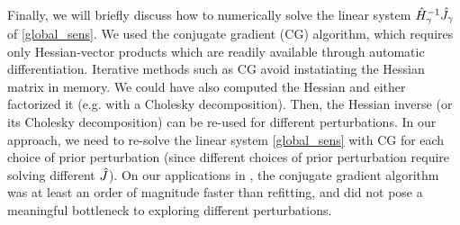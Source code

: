 Finally, we will briefly discuss how to numerically solve the linear system
$\hat{H}_\gamma^{-1}\hat J_\gamma$ of \eqref{global_sens}.  We used the
conjugate gradient (CG) algorithm, which requires only Hessian-vector products
which are readily available through automatic differentiation. Iterative methods
such as CG avoid instatiating the Hessian matrix in memory. We could have also
computed the Hessian and either factorized it (e.g. with a Cholesky
decomposition). Then, the Hessian inverse (or its Cholesky decomposition) can be
re-used for different perturbations. In our approach, we need to re-solve the
linear system \eqref{global_sens} with CG for each choice of prior perturbation
(since different choices of prior perturbation require solving different
$\hat J$). On our applications in , the conjugate
gradient algorithm was at least an order of magnitude faster than refitting, and
did not pose a meaningful bottleneck to exploring different perturbations.
